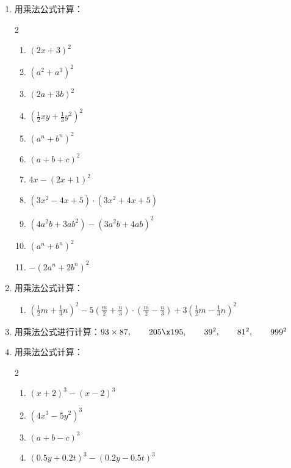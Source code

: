 \begin{enumerate}
\item 用乘法公式计算：
   \begin{multicols}{2}
    \begin{enumerate}
        \item $(2x+3)^2$
        \item $(a^2+a^3)^2$
        \item $(2a+3b)^2$
        \item $\left(\frac{1}{2}xy+\frac{1}{3}y^2\right)^2$
        \item $(a^n+b^n)^2$
        \item $(a+b+c)^2$
        \item $4x-(2x+1)^2$
        \item $(3x^2-4x+5) \cdot (3x^2+4x+5)$
        \item $(4a^2b+3ab^2)-(3a^2b+4ab)^2$
        \item $(a^n+b^n)^2$
        \item $-(2a^n+2b^n)^2$
    \end{enumerate}
   \end{multicols}

\item 用乘法公式计算：

    \begin{enumerate}
        \item $\left(\frac{1}{2}m+\frac{1}{3}n\right)^2 -5\left(\frac{m}{2}+\frac{n}{3}\right)\cdot \left(\frac{m}{2}-\frac{n}{3}\right)+3\left(\frac{1}{2}m-\frac{1}{3}n\right)^2$
    \end{enumerate}
    

\item 用乘法公式进行计算：$93\times 87,\qquad 205\x 195,\qquad 39^2,\qquad 81^2,\qquad 999^2$

\item 用乘法公式计算：
\begin{multicols}{2}
    \begin{enumerate}
        \item $(x+2)^3-(x-2)^3$
        \item $(4x^3-5y^2)^3$
        \item $(a+b-c)^3$
        \item $(0.5y+0.2t)^3-(0.2y-0.5t)^3$
    \end{enumerate}
\end{multicols}


\end{enumerate}
